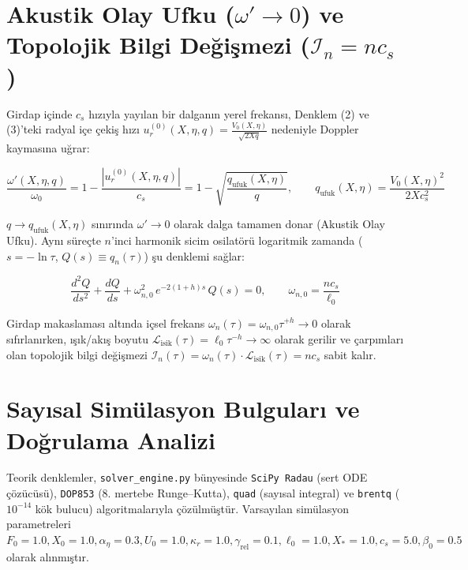 \documentclass[12pt,a4paper]{article}
\begin{document}
\section{Akustik Olay Ufku ($\omega' \to 0$) ve Topolojik Bilgi Değişmezi ($\mathcal{I}_n = n c_s$)}

Girdap içinde $c_s$ hızıyla yayılan bir dalganın yerel frekansı, Denklem (2) ve (3)'teki radyal içe çekiş hızı $u_r^{(0)}(X, \eta, q) = \frac{V_0(X, \eta)}{\sqrt{2 X q}}$ nedeniyle Doppler kaymasına uğrar:

\begin{equation}
\frac{\omega'(X, \eta, q)}{\omega_0} = 1 - \frac{|u_r^{(0)}(X, \eta, q)|}{c_s} = 1 - \sqrt{\frac{q_{\mathrm{ufuk}}(X, \eta)}{q}}, \qquad q_{\mathrm{ufuk}}(X, \eta) = \frac{V_0(X, \eta)^2}{2 X c_s^2}
\label{eq:horizon}
\end{equation}

$q \to q_{\mathrm{ufuk}}(X, \eta)$ sınırında $\omega' \to 0$ olarak dalga tamamen donar (Akustik Olay Ufku). Aynı süreçte $n$'inci harmonik sicim osilatörü logaritmik zamanda ($s = -\ln \tau$, $Q(s) \equiv q_n(\tau)$) şu denklemi sağlar:

\begin{equation}
\frac{d^2 Q}{ds^2} + \frac{dQ}{ds} + \omega_{n,0}^2 \, e^{-2(1+h)s} \, Q(s) = 0, \qquad \omega_{n,0} = \frac{n c_s}{\ell_0}
\label{eq:oscillator}
\end{equation}

Girdap makaslaması altında içsel frekans $\omega_n(\tau) = \omega_{n,0} \tau^{+h} \to 0$ olarak sıfırlanırken, ışık/akış boyutu $\mathcal{L}_{\mathrm{isik}}(\tau) = \ell_0 \tau^{-h} \to \infty$ olarak gerilir ve çarpımları olan topolojik bilgi değişmezi $\mathcal{I}_n(\tau) = \omega_n(\tau) \cdot \mathcal{L}_{\mathrm{isik}}(\tau) = n c_s$ sabit kalır.

\section{Sayısal Simülasyon Bulguları ve Doğrulama Analizi}

Teorik denklemler, \texttt{solver\_engine.py} bünyesinde \texttt{SciPy Radau} (sert ODE çözücüsü), \texttt{DOP853} (8. mertebe Runge--Kutta), \texttt{quad} (sayısal integral) ve \texttt{brentq} ($10^{-14}$ kök bulucu) algoritmalarıyla çözülmüştür. Varsayılan simülasyon parametreleri $F_0 = 1.0, X_0 = 1.0, \alpha_\eta = 0.3, U_0 = 1.0, \kappa_r = 1.0, \gamma_{\mathrm{rel}} = 0.1, \ell_0 = 1.0, X_* = 1.0, c_s = 5.0, \beta_0 = 0.5$ olarak alınmıştır.
\end{document}
